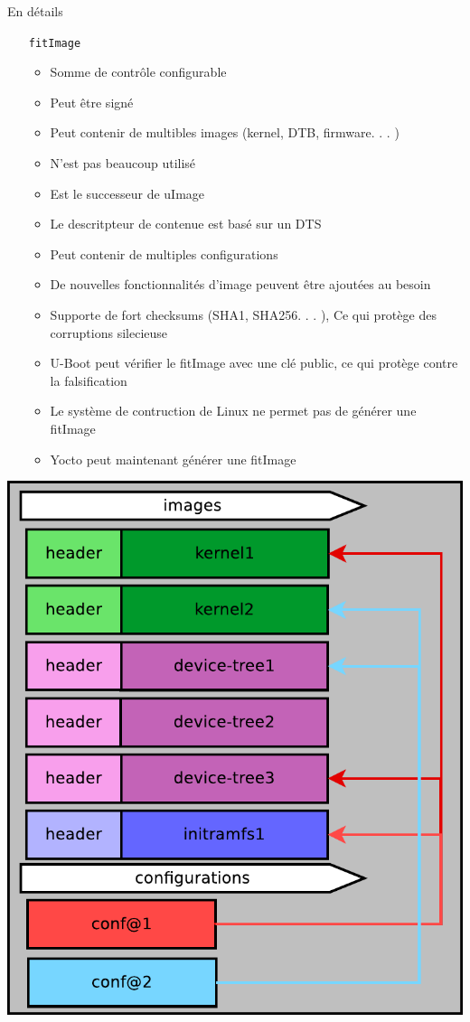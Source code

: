\documentclass[aspectratio=169]{beamer}
\begin{document}
\begin{frame}{En détails}
\begin{itemize}
	\item[\texttt{fitImage}]
	\begin{itemize}
	 	\item Somme de contrôle configurable
	 	\item Peut être signé
	 	\item Peut contenir de multibles images (kernel, DTB, firmware. . . )
	 	\item N'est pas beaucoup utilisé
 		\item Est le successeur de uImage
	 	\item Le descritpteur de contenue est basé sur un DTS
	 	\item Peut contenir de multiples configurations
	 	\item De nouvelles fonctionnalités d'image peuvent être ajoutées au besoin
	 	\item Supporte de fort checksums (SHA1, SHA256. . . ), Ce qui protège des corruptions silecieuse
	 	\item U-Boot peut vérifier le fitImage avec une clé public, ce qui protège contre la falsification
	 	\item Le système de contruction de Linux ne permet pas de générer une fitImage
	 	\item Yocto peut maintenant générer une fitImage
	\end{itemize}
\end{itemize}
\end{frame}

\begin{frame}
\begin{center}
\includegraphics[height=0.9\textheight]{images/fitImage.png}
\end{center}
\end{frame}
\end{document}
